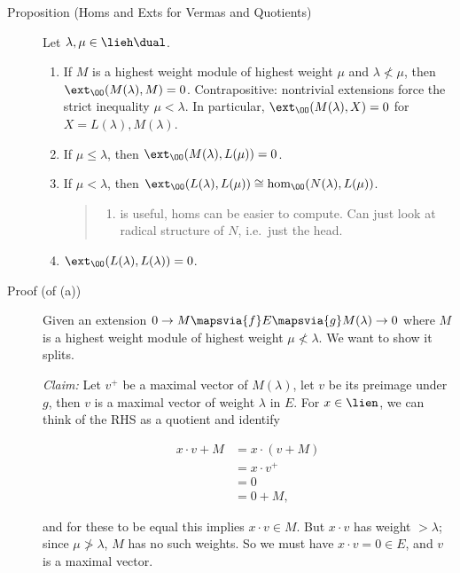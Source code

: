 \begin{description}
\item[Proposition (Homs and Exts for Vermas and Quotients)]
Let \(\lambda, \mu \in \lieh\dual\).

\begin{enumerate}
\def\labelenumi{\alph{enumi}.}
\item
  If \(M\) is a highest weight module of highest weight \(\mu\) and
  \(\lambda \not< \mu\), then \(\ext_\OO(M(\lambda), M) = 0\).
  Contrapositive: nontrivial extensions force the strict inequality
  \(\mu < \lambda\). In particular, \(\ext_\OO(M(\lambda), X) = 0\) for
  \(X = L(\lambda), M(\lambda)\).
\item
  If \(\mu \leq \lambda\), then \(\ext_\OO(M(\lambda), L(\mu)) = 0\).
\item
  If \(\mu < \lambda\), then
  \(\ext_\OO(L(\lambda), L(\mu)) \cong \hom_\OO(N(\lambda), L(\mu))\).

  \begin{quote}
  \begin{enumerate}
  \def\labelenumii{(\alph{enumii})}
  \setcounter{enumii}{2}
  \tightlist
  \item
    is useful, homs can be easier to compute. Can just look at radical
    structure of \(N\), i.e.~just the head.
  \end{enumerate}
  \end{quote}
\item
  \(\ext_\OO(L(\lambda), L(\lambda)) = 0\).
\end{enumerate}
\item[Proof (of (a))]
Given an extension
\(0 \to M \mapsvia{f} E \mapsvia{g} M(\lambda) \to 0\) where \(M\) is a
highest weight module of highest weight \(\mu \not< \lambda\). We want
to show it splits.

\emph{Claim:} Let \(v^+\) be a maximal vector of \(M(\lambda)\), let
\(v\) be its preimage under \(g\), then \(v\) is a maximal vector of
weight \(\lambda\) in \(E\). For \(x\in \lien\), we can think of the RHS
as a quotient and identify

\begin{align*}
x\cdot v + M
&= x\cdot (v+M) \\
&= x\cdot v^+ \\
&= 0 \\
&= 0 + M
,\end{align*}

and for these to be equal this implies \(x\cdot v \in M\). But
\(x\cdot v\) has weight \(> \lambda\); since \(\mu \not> \lambda\),
\(M\) has no such weights. So we must have \(x\cdot v = 0\in E\), and
\(v\) is a maximal vector.


\end{description}
